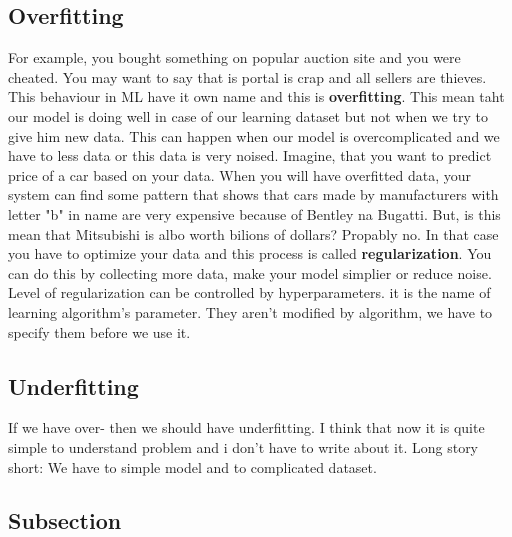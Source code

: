 \documentclass{article}
\begin{document}
    \subsection{Overfitting}
    For example, you bought something on popular auction site and you were cheated. You may want to say that is portal is crap and all sellers are thieves. This behaviour in ML have it own name and this is \textbf{overfitting}. This mean taht our model is doing well in case of our learning dataset but not when we try to give him new data. This can happen when our model is overcomplicated and we have to less data or this data is very noised. Imagine, that you want to predict price of a car based on your data. When you will have overfitted data, your system can find some pattern that shows that cars made by manufacturers with letter "b" in name are very expensive because of Bentley na Bugatti. But, is this mean that Mitsubishi is albo worth bilions of dollars? Propably no. In that case you have to optimize your data and this process is called \textbf{regularization}. You can do this by collecting more data, make your model simplier or reduce noise. Level of regularization can be controlled by hyperparameters. it is the name of learning algorithm's parameter. They aren't modified by algorithm, we have to specify them before we use it.

    \subsection{Underfitting} 
    If we have over- then we should have underfitting. I think that now it is quite simple to understand problem and i don't have to write about it. Long story short: We have to simple model and to complicated dataset.
  \newpage

\subsection{Subsection}
\end{document}
